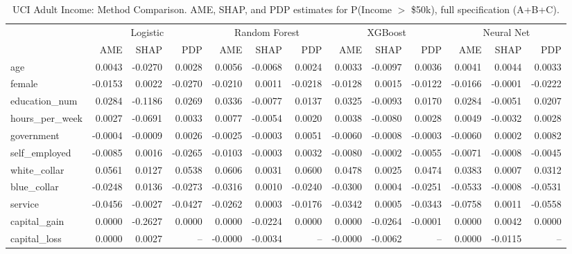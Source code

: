 \documentclass[12pt,a4paper]{article}
\numberwithin{equation}{section}
\theoremstyle{plain}
\theoremstyle{definition}
\begin{document}
	\begin{table}
		\centering
		\small
		\begin{threeparttable}
			\caption{UCI Adult Income: Method Comparison. AME, SHAP, and PDP estimates for P(Income $>$ \$50k), full specification (A+B+C).}
			\label{tab:adult_method_comparison}
			\begin{tabular}{lrrrrrrrrrrrr}
				\toprule
				& \multicolumn{3}{c}{Logistic} & \multicolumn{3}{c}{Random Forest} & \multicolumn{3}{c}{XGBoost} & \multicolumn{3}{c}{Neural Net} \\
				\cmidrule(lr){2-4} \cmidrule(lr){5-7} \cmidrule(lr){8-10} \cmidrule(lr){11-13}
				& AME & SHAP & PDP & AME & SHAP & PDP & AME & SHAP & PDP & AME & SHAP & PDP \\
				\midrule
				age & 0.0043 & -0.0270 & 0.0028 & 0.0056 & -0.0068 & 0.0024 & 0.0033 & -0.0097 & 0.0036 & 0.0041 & 0.0044 & 0.0033 \\
				female & -0.0153 & 0.0022 & -0.0270 & -0.0210 & 0.0011 & -0.0218 & -0.0128 & 0.0015 & -0.0122 & -0.0166 & -0.0001 & -0.0222 \\
				education\_num & 0.0284 & -0.1186 & 0.0269 & 0.0336 & -0.0077 & 0.0137 & 0.0325 & -0.0093 & 0.0170 & 0.0284 & -0.0051 & 0.0207 \\
				\midrule
				hours\_per\_week & 0.0027 & -0.0691 & 0.0033 & 0.0077 & -0.0054 & 0.0020 & 0.0038 & -0.0080 & 0.0028 & 0.0049 & -0.0032 & 0.0028 \\
				government & -0.0004 & -0.0009 & 0.0026 & -0.0025 & -0.0003 & 0.0051 & -0.0060 & -0.0008 & -0.0003 & -0.0060 & 0.0002 & 0.0082 \\
				self\_employed & -0.0085 & 0.0016 & -0.0265 & -0.0103 & -0.0003 & 0.0032 & -0.0080 & -0.0002 & -0.0055 & -0.0071 & -0.0008 & -0.0045 \\
				white\_collar & 0.0561 & 0.0127 & 0.0538 & 0.0606 & 0.0031 & 0.0600 & 0.0478 & 0.0025 & 0.0474 & 0.0383 & 0.0007 & 0.0312 \\
				blue\_collar & -0.0248 & 0.0136 & -0.0273 & -0.0316 & 0.0010 & -0.0240 & -0.0300 & 0.0004 & -0.0251 & -0.0533 & -0.0008 & -0.0531 \\
				service & -0.0456 & -0.0027 & -0.0427 & -0.0262 & 0.0003 & -0.0176 & -0.0342 & 0.0005 & -0.0343 & -0.0758 & 0.0011 & -0.0558 \\
				\midrule
				capital\_gain & 0.0000 & -0.2627 & 0.0000 & 0.0000 & -0.0224 & 0.0000 & 0.0000 & -0.0264 & -0.0001 & 0.0000 & 0.0042 & 0.0000 \\
				capital\_loss & 0.0000 & 0.0027 & -- & -0.0000 & -0.0034 & -- & -0.0000 & -0.0062 & -- & 0.0000 & -0.0115 & -- \\

\end{tabular}
\end{threeparttable}
\end{table}
\end{document}
